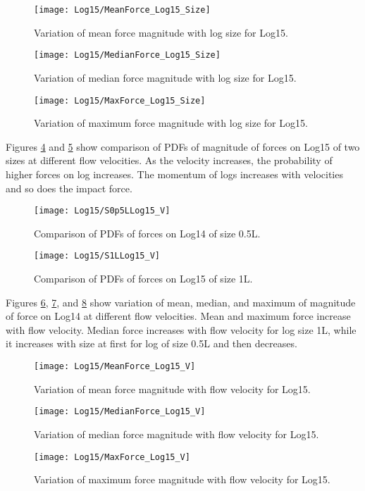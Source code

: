 \begin{figure}
\centering
\texttt{[image: Log15/MeanForce\_Log15\_Size]}
\caption{\label{fig:MeanForce_Log15_Size}Variation of mean force magnitude with log size for Log15.}
\end{figure}
\begin{figure}
\centering
\texttt{[image: Log15/MedianForce\_Log15\_Size]}
\caption{\label{fig:MedianForce_Log15_Size}Variation of median force magnitude with log size for Log15.}
\end{figure}
\begin{figure}
\centering
\texttt{[image: Log15/MaxForce\_Log15\_Size]}
\caption{\label{fig:MaxForce_Log15_Size}Variation of maximum force magnitude with log size for Log15.}
\end{figure}

\noindent Figures \ref{fig:S0p5LLog15_V} and \ref{fig:S1LLog15_V} show comparison of PDFs of magnitude of forces on Log15 of two sizes at different flow velocities. As the velocity increases, the probability of higher forces on log increases. The momentum of logs increases with velocities and so does the impact force.

\begin{figure}
\centering
\texttt{[image: Log15/S0p5LLog15\_V]}
\caption{\label{fig:S0p5LLog15_V}Comparison of PDFs of forces on Log14 of size 0.5L.}
\end{figure}
\begin{figure}
\centering
\texttt{[image: Log15/S1LLog15\_V]}
\caption{\label{fig:S1LLog15_V}Comparison of PDFs of forces on Log15 of size 1L.}
\end{figure}

\noindent Figures \ref{fig:MeanForce_Log15_V}, \ref{fig:MedianForce_Log15_V}, and \ref{fig:MaxForce_Log15_V} show variation of mean, median, and maximum of magnitude of force on Log14 at different flow velocities. Mean and maximum force increase with flow velocity. Median force increases with flow velocity for log size 1L, while it increases with size at first for log of size 0.5L and then decreases. 

\begin{figure}
\centering
\texttt{[image: Log15/MeanForce\_Log15\_V]}
\caption{\label{fig:MeanForce_Log15_V}Variation of mean force magnitude with flow velocity for Log15.}
\end{figure}
\begin{figure}
\centering
\texttt{[image: Log15/MedianForce\_Log15\_V]}
\caption{\label{fig:MedianForce_Log15_V}Variation of median force magnitude with flow velocity for Log15.}
\end{figure}
\begin{figure}
\centering
\texttt{[image: Log15/MaxForce\_Log15\_V]}
\caption{\label{fig:MaxForce_Log15_V}Variation of maximum force magnitude with flow velocity for Log15.}
\end{figure}

